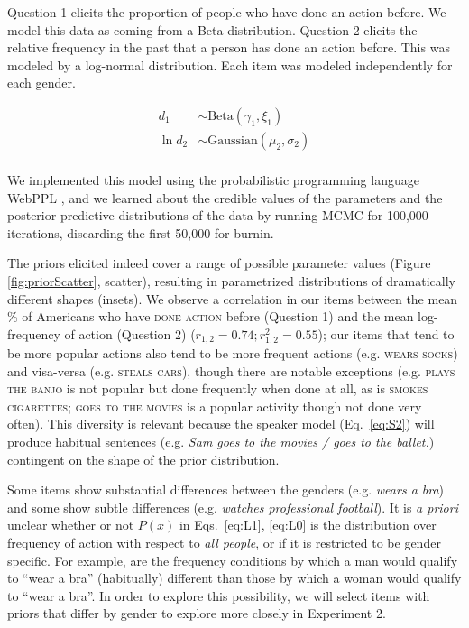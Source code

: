 \documentclass[10pt,letterpaper]{article}
\newcommand{\ndg}[1]{\textcolor{Green}{[ndg: #1]}}
\begin{document}
Question 1 elicits the proportion of people who have done an action before. 
We model this data as coming from a Beta distribution. 
Question 2 elicits the relative frequency in the past that a person has done an action before.
This was modeled by a log-normal distribution. 
Each item was modeled independently for each gender.
%
\begin{minipage}{0.5 \textwidth} \small
\begin{align*}
d_{1} &\sim \text{Beta}(\gamma_{1}, \xi_{1}) \\
\ln d_{2} &\sim \text{Gaussian}(\mu_{2}, \sigma_{2}) \\
\end{align*}
\end{minipage}
%
We implemented this model using the probabilistic programming language WebPPL \cite{dippl}, and we learned about the credible values of the parameters and the posterior predictive distributions of the data by running MCMC for 100,000 iterations, discarding the first 50,000 for burnin.
%

The priors elicited indeed cover a range of possible parameter values (Figure \ref{fig:priorScatter}, scatter), resulting in parametrized distributions of dramatically different shapes (insets).  
We observe a correlation in our items between the mean \% of Americans who have \textsc{done action} before (Question 1) and the mean log-frequency  of action (Question 2) ($r_{1,2} = 0.74; r^2_{1,2} = 0.55$); our items that tend to be more popular actions also tend to be more frequent actions (e.g. \textsc{wears socks}) and visa-versa (e.g. \textsc{steals cars}), though there are notable exceptions (e.g. \textsc{plays the banjo} is not popular but done frequently when done at all, as is \textsc{smokes cigarettes}; \textsc{goes to the movies} is a popular activity though not done very often). 
This diversity is relevant because the speaker model (Eq.~\ref{eq:S2}) will produce habitual sentences (e.g. \emph{Sam goes to the movies / goes to the ballet.}) contingent on the shape of the prior distribution. 

Some items show substantial differences between the genders (e.g. \emph{wears a bra}) and some show subtle differences (e.g. \emph{watches professional football}). 
It is \emph{a priori} unclear whether or not $P(x)$ in Eqs.~\ref{eq:L1}, \ref{eq:L0} is the distribution over frequency of action with respect to \emph{all people}, or if it is restricted to be gender specific.
For example, are the frequency conditions by which a man would qualify to ``wear a bra'' (habitually) different than those by which a woman would qualify to ``wear a bra''.
In order to explore this possibility, we will select items with priors that differ by gender to explore more closely in Experiment 2.
\end{document}
